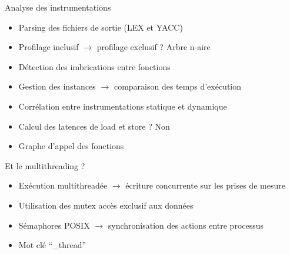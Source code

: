 \documentclass{beamer}
\begin{document}
\begin{frame}{Analyse des instrumentations}
  \begin{itemize}
  \item Parsing des fichiers de sortie (LEX et YACC)
  \item Profilage inclusif $\rightarrow$ profilage exclusif ? Arbre n-aire
  \item Détection des imbrications entre fonctions
  \item Gestion des instances $\rightarrow$ comparaison des temps d'exécution
  \item Corrélation entre instrumentations statique et dynamique
  \item Calcul des latences de load et store ? Non
  \item Graphe d'appel des fonctions
  \end{itemize}
\end{frame}

\begin{frame}{Et le multithreading ?}
  \begin{itemize}
  \item Exécution multithreadée $\rightarrow$ écriture concurrente sur les prises de mesure
  \item Utilisation des mutex accès exclusif aux données
  \item Sémaphores POSIX $\rightarrow$ synchronisation des actions entre processus
  \item Mot clé ``\_thread''
  \end{itemize}
\end{frame}
\end{document}
